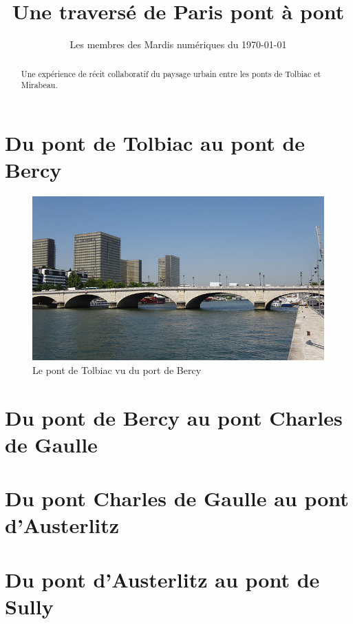 \documentclass[11pt]{article}
\title{Une traversé de Paris pont à pont}
\author{Les membres des Mardis numériques du \today}
\begin{document}
\maketitle

\begin{abstract}
    Une expérience de récit collaboratif du paysage urbain entre les ponts de Tolbiac et Mirabeau.
\end{abstract}

\section*{Du pont de Tolbiac au pont de Bercy}

\begin{figure}[h]
\centering
\includegraphics[width=15cm]{images/pont_de_tolbiac}
\caption{Le pont de Tolbiac vu du port de Bercy}
\end{figure}


\section*{Du pont de Bercy au pont Charles de Gaulle}

\section*{Du pont Charles de Gaulle au pont d'Austerlitz}

\section*{Du pont d'Austerlitz au pont de Sully}
\end{document}
